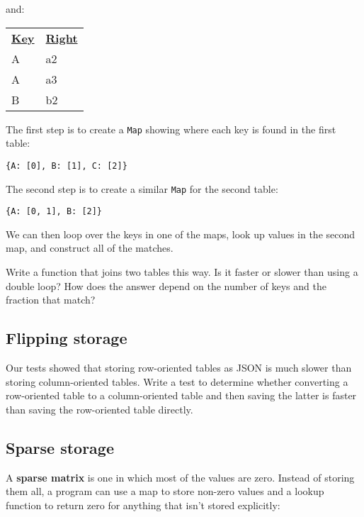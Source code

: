 \documentclass[krantzl]{krantz}
\newcommand{\glossref}[1]{\textbf{#1}}
\begin{document}
\vspace{\baselineskip}


\noindent and:


\vspace{\baselineskip}
\begin{tabular}{ll}
\textbf{\underline{Key}} & \textbf{\underline{Right}} \\
A & a2 \\
A & a3 \\
B & b2 \\
\end{tabular}

\vspace{\baselineskip}


\noindent The first step is to create a \texttt{Map} showing where each key is found in the first table:

\begin{lstlisting}[frame=tblr]
{A: [0], B: [1], C: [2]}
\end{lstlisting}


\noindent The second step is to create a similar \texttt{Map} for the second table:

\begin{lstlisting}[frame=tblr]
{A: [0, 1], B: [2]}
\end{lstlisting}


\noindent We can then loop over the keys in one of the maps,
look up values in the second map,
and construct all of the matches.


Write a function that joins two tables this way.
Is it faster or slower than using a double loop?
How does the answer depend on the number of keys and the fraction that match?

\subsection*{Flipping storage}


Our tests showed that storing row-oriented tables as JSON
is much slower than storing column-oriented tables.
Write a test to determine whether converting a row-oriented table to a column-oriented table
and then saving the latter
is faster than saving the row-oriented table directly.

\subsection*{Sparse storage}


A \glossref{sparse matrix} is one in which most of the values are zero.
Instead of storing them all,
a program can use a map to store non-zero values
and a lookup function to return zero for anything that isn’t stored explicitly:
\end{document}
